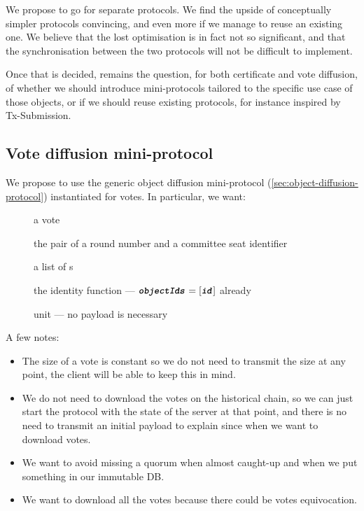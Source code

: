 We propose to go for separate protocols.
We find the upside of conceptually simpler protocols convincing, and even more if we manage to reuse an existing one.
We believe that the lost optimisation is in fact not so significant, and that the synchronisation between the two protocols will not be difficult to implement.

Once that is decided, remains the question, for both certificate and vote diffusion, of whether we should introduce mini-protocols tailored to the specific use case of those objects, or if we should reuse existing protocols, for instance inspired by Tx-Submission.


\subsection{Vote diffusion mini-protocol}%
\label{sec:vote-diffusion}

We propose to use the generic object diffusion mini-protocol (\cref{sec:object-diffusion-protocol}) instantiated for votes.
In particular, we want:
%
\begin{description}
\item[] a vote
\item[] the pair of a round number and a committee seat
  identifier
\item[] a list of s
\item[] the identity function --- \(\textbf{\texttt{\textit{objectIds}}} =
  [\textbf{\texttt{\textit{id}}}]\) already
\item[] unit --- no payload is necessary
\end{description}

A few notes:

\begin{itemize}
\item
  The size of a vote is constant so we do not need to transmit the size at any point, the client will be able to keep this in mind.

\item
  We do not need to download the votes on the historical chain, so we can just start the protocol with the state of the server at that point, and there is no need to transmit an initial payload to explain since when we want to download votes.

\item
  We want to avoid missing a quorum when almost caught-up and when we put something in our immutable DB.

\item
  We want to download all the votes because there could be votes equivocation.
\end{itemize}

